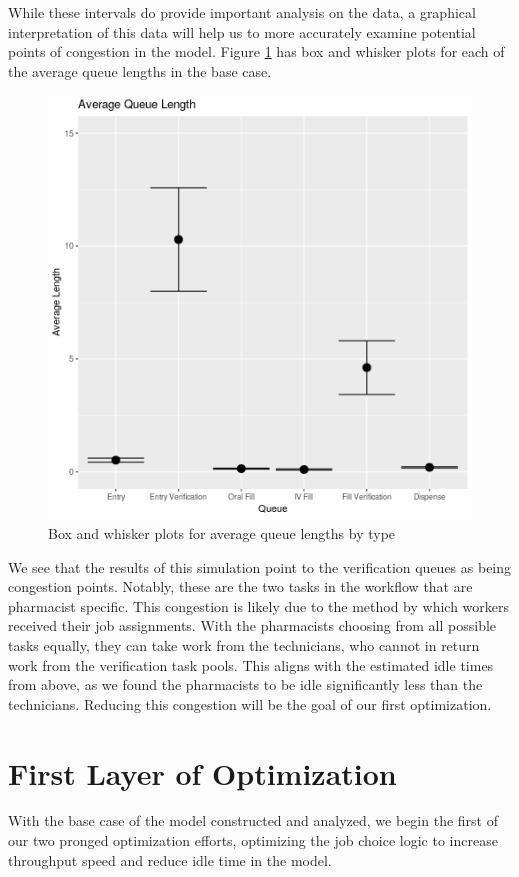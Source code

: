 \documentclass[10pt]{report}            %
\begin{document}
While these intervals do provide important analysis on the data, a graphical interpretation of this data will help us to more accurately examine potential points of congestion in the model. Figure \ref{fig:baseQ} has box and whisker plots for each of the average queue lengths in the base case.
\begin{figure}[H]
\centering
\includegraphics[scale=.5]{BaseQueueCIs.png}
\caption{Box and whisker plots for average queue lengths by type}
\label{fig:baseQ}
\end{figure}
We see that the results of this simulation point to the verification queues as being congestion points. Notably, these are the two tasks in the workflow that are pharmacist specific. This congestion is likely due to the method by which workers received their job assignments. With the pharmacists choosing from all possible tasks equally, they can take work from the technicians, who cannot in return work from the verification task pools. This aligns with the estimated idle times from above, as we found the pharmacists to be idle significantly less than the technicians. Reducing this congestion will be the goal of our first optimization.
\section*{First Layer of Optimization}
With the base case of the model constructed and analyzed, we begin the first of our two pronged optimization efforts, optimizing the job choice logic to increase throughput speed and reduce idle time in the model.
\end{document}

